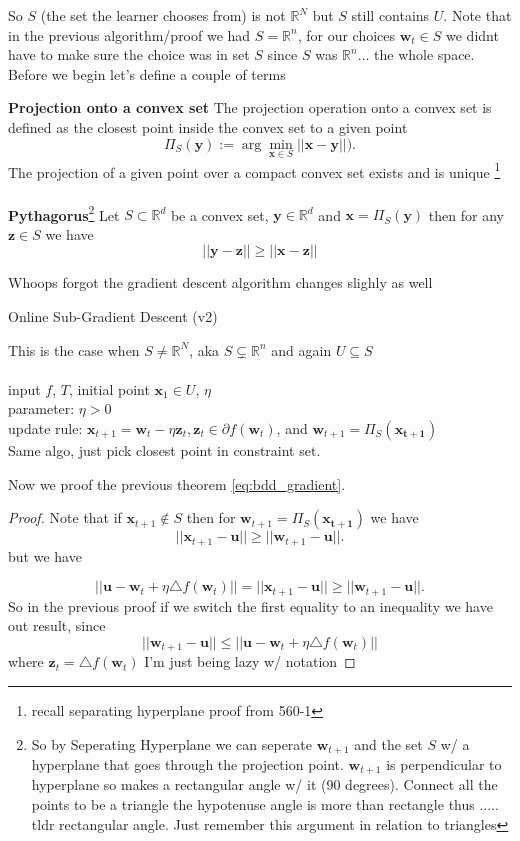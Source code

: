 \documentclass[11pt]{article}
\theoremstyle{quest}
\newcommand{\R}{\mathbb{R}}
\begin{document}
%
So $S$ (the set the learner chooses from) is not $\R^N$ but $S$ still contains $U$. Note that in the previous algorithm/proof we had $S = \R^n$, for our choices $\mathbf{w}_t\in S$ we didnt have to make sure the choice was in set $S$ since $S$ was $\R^n$$\dots$ the whole space. Before we begin let's define a couple of terms
\begin{tcolorbox}
\textbf{Projection onto a convex set}
The projection operation onto a convex set is defined as the closest point inside the convex set to a given point 
\[\Pi_S(\mathbf{y}):= \arg \min_{\mathbf{x}\in S}||\mathbf{x}-\mathbf{y}||).\] The projection of a given point over a compact convex set exists and is unique \footnote{recall separating hyperplane proof from 560-1}\\ \\ 
\textbf{Pythagorus}\footnote{So by Seperating Hyperplane we can seperate $\mathbf{w}_{t+1}$ and the set $S$ w/ a hyperplane that goes through the projection point. $\mathbf{w}_{t+1}$ is perpendicular to hyperplane so makes a rectangular angle w/ it (90 degrees).  Connect all the points to be a triangle the hypotenuse angle is more than rectangle thus ..... tldr rectangular angle. Just remember this argument in relation to triangles}
Let $S\subset \R^d$ be a convex set, $\mathbf{y}\in \R^d$ and $\mathbf{x}=\Pi_S(\mathbf{y})$ then for any $\mathbf{z}\in S$ we have $$||\mathbf{y}-\mathbf{z}|| \ge ||\mathbf{x}-\mathbf{z}||$$
\end{tcolorbox}
 Whoops forgot the gradient descent algorithm changes slighly as well
\begin{tcolorbox}
\begin{center}Online Sub-Gradient Descent (v2)\end{center}
This is the case when $S\neq \R^N$, aka  $S \subsetneq  \R^n$ and again $U\subseteq S$\\ \\
input $f$, $T$, initial point $\mathbf{x}_1\in U$, $\eta$\\
parameter: $\eta >0$\\
update rule: $\mathbf{x}_{t+1}=\mathbf{w}_{t}-\eta \mathbf{z}_{t}, \mathbf{z}_{t} \in \partial f(\mathbf{w}_t)$, and $\mathbf{w}_{t+1}=\Pi_S(\mathbf{x_{t+1}})$\\

Same algo, just pick closest point in constraint set. 
\end{tcolorbox}
Now we proof the previous theorem {\color{blue} \eqref{eq:bdd_gradient}}. 
\begin{proof}
Note that if $\mathbf{x}_{t+1} \notin S$ then for $\mathbf{w}_{t+1}=\Pi_S(\mathbf{x_{t+1}})$ we have $$||\mathbf{x}_{t+1}-\mathbf{u}|| \ge ||\mathbf{w}_{t+1}-\mathbf{u}||.$$ but we have

$$||\mathbf{u}-\mathbf{w}_t+\eta\triangle f(\mathbf{w}_t)||=||\mathbf{x}_{t+1}-\mathbf{u}|| \ge ||\mathbf{w}_{t+1}-\mathbf{u}||.$$ So in the previous proof if we switch the first equality to an inequality we have out result, since $$ ||\mathbf{w}_{t+1}-\mathbf{u}||\le ||\mathbf{u}-\mathbf{w}_t+\eta\triangle f(\mathbf{w}_t)||$$ where $\mathbf{z}_t=\triangle f(\mathbf{w}_t)$ I'm just being lazy w/ notation
\end{proof}
\end{document}
